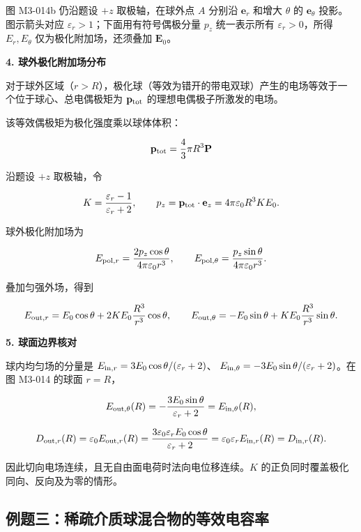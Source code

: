 图 M3-014b 仍沿题设 \(+z\) 取极轴，在球外点 \(A\) 分别沿 \(\mathbf e_r\)
和增大 \(\theta\) 的 \(\mathbf e_{\theta}\) 投影。图示箭头对应
\(\varepsilon_r>1\)；下面用有符号偶极分量 \(p_z\) 统一表示所有
\(\varepsilon_r>0\)，所得 \(E_r,E_{\theta}\) 仅为极化附加场，还须叠加
\(\mathbf E_0\)。

\textbf{4. 球外极化附加场分布}

对于球外区域（\(r > R\)），极化球（等效为错开的带电双球）产生的电场等效于一个位于球心、总电偶极矩为
\(\mathbf p_{\rm tot}\) 的理想电偶极子所激发的电场。

该等效偶极矩为极化强度乘以球体体积：

\[
\mathbf p_{\rm tot} = \frac{4}{3}\pi R^3 \mathbf{P}
\]

沿题设 \(+z\) 取极轴，令

\[
K=\frac{\varepsilon_r-1}{\varepsilon_r+2},\qquad
p_z=\mathbf p_{\rm tot}\cdot\mathbf e_z
=4\pi\varepsilon_0R^3KE_0.
\]

球外极化附加场为

\[
E_{{\rm pol},r}=\frac{2p_z\cos\theta}{4\pi\varepsilon_0r^3},
\qquad E_{{\rm pol},\theta}=\frac{p_z\sin\theta}{4\pi\varepsilon_0r^3}.
\]

叠加匀强外场，得到

\[
E_{{\rm out},r}=E_0\cos\theta+
2KE_0\frac{R^3}{r^3}\cos\theta,\qquad
E_{{\rm out},\theta}=-E_0\sin\theta+
KE_0\frac{R^3}{r^3}\sin\theta.
\]

\textbf{5. 球面边界核对}

球内均匀场的分量是 \(E_{{\rm in},r}=3E_0\cos\theta/(\varepsilon_r+2)\)、
\(E_{{\rm in},\theta}=-3E_0\sin\theta/(\varepsilon_r+2)\)。在图 M3-014
的球面 \(r=R\)，

\[
E_{{\rm out},\theta}(R)
=-\frac{3E_0\sin\theta}{\varepsilon_r+2}
=E_{{\rm in},\theta}(R),
\]

\[
D_{{\rm out},r}(R)
=\varepsilon_0E_{{\rm out},r}(R)
=\frac{3\varepsilon_0\varepsilon_r E_0\cos\theta}{\varepsilon_r+2}
=\varepsilon_0\varepsilon_r E_{{\rm in},r}(R)
=D_{{\rm in},r}(R).
\]

因此切向电场连续，且无自由面电荷时法向电位移连续。\(K\)
的正负同时覆盖极化同向、反向及为零的情形。

\subsection{例题三：稀疏介质球混合物的等效电容率}\label{m3:ux4f8bux9898ux4e09ux7a00ux758fux4ecbux8d28ux7403ux6df7ux5408ux7269ux7684ux7b49ux6548ux7535ux5bb9ux7387}

